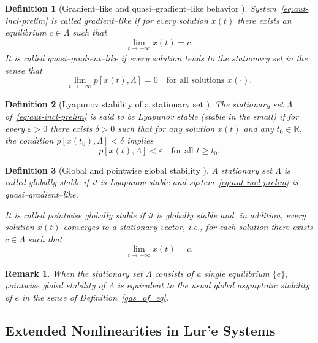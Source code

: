 \documentclass[journal]{IEEEtran}
\theoremstyle{myplain}
\newtheorem{definition}{Definition}
\newtheorem{remark}{Remark}
\begin{document}
\begin{definition}[Gradient--like and quasi–gradient--like behavior
{\cite[Defs.~1.10--1.11]{YLG}}]\label{quasi_gradient_like}
System~\eqref{eq:aut-incl-prelim} is called
\emph{gradient–like} if for every solution $x(t)$ there exists an
equilibrium $c\in\Lambda$ such that
\[
   \lim_{t\to+\infty} x(t) = c.
\]
It is called \emph{quasi–gradient–like} if every solution tends to the
stationary set in the sense that
\[
   \lim_{t\to+\infty} p[x(t),\Lambda] = 0
   \quad\text{for all solutions } x(\cdot).
\]
\end{definition}

\begin{definition}[Lyapunov stability of a stationary set {\cite[Def.~1.12]{YLG}}]
The stationary set $\Lambda$ of~\eqref{eq:aut-incl-prelim} is said to be
\emph{Lyapunov stable} (stable in the small) if for every $\varepsilon>0$
there exists $\delta>0$ such that for any solution $x(t)$ and any
$t_0\in\mathbb{R}$, the condition
$p[x(t_0),\Lambda]<\delta$ implies
\[
   p[x(t),\Lambda] < \varepsilon
   \quad\text{for all } t\ge t_0.
\]
\end{definition}

\begin{definition}[Global and pointwise global stability
{\cite[Defs.~1.13--1.14]{YLG}}]
A stationary set $\Lambda$ is called \emph{globally stable} if it is
Lyapunov stable and system~\eqref{eq:aut-incl-prelim} is
quasi–gradient–like.

It is called \emph{pointwise globally stable} if it is globally stable
and, in addition, every solution $x(t)$ converges to a stationary
vector, i.e., for each solution there exists $c\in\Lambda$ such that
\[
   \lim_{t\to+\infty} x(t) = c.
\]
\end{definition}

\begin{remark}
When the stationary set $\Lambda$ consists of a single equilibrium
$\{e\}$, pointwise global stability of $\Lambda$ is equivalent to the
usual \emph{global asymptotic stability} of $e$ in the sense of
Definition~\ref{gas_of_eq}.
\end{remark}

\subsection{Extended Nonlinearities in Lur'e Systems}
\label{subsec:extended-nonlinearity}
\end{document}
